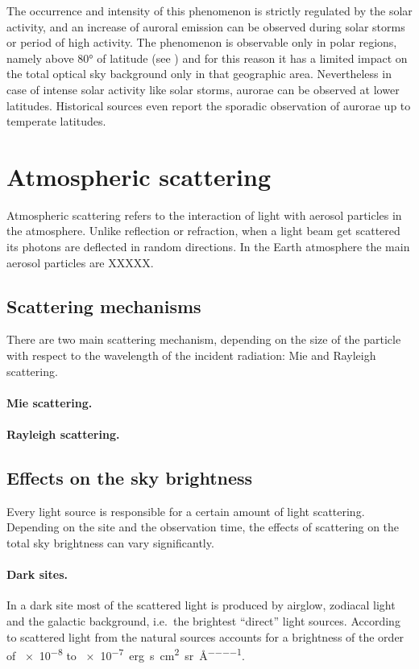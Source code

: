 The occurrence and intensity of this phenomenon is strictly regulated by the solar activity, and an increase of auroral emission can be observed during solar storms or period of high activity. The phenomenon is observable only in polar regions, namely above \ang{80} of latitude (see \cite{eather1969latitudinal}) and for this reason it has a limited impact on the total optical sky background only in that geographic area. Nevertheless in case of intense solar activity like solar storms, aurorae can be observed at lower latitudes. Historical sources even report the sporadic observation of aurorae up to temperate latitudes.


\section{Atmospheric scattering}
Atmospheric scattering refers to the interaction of light with aerosol particles in the atmosphere. Unlike reflection or refraction, when a light beam get scattered its photons are deflected in random directions. In the Earth atmosphere the main aerosol particles are XXXXX.

\subsection{Scattering mechanisms}
There are two main scattering mechanism, depending on the size of the particle with respect to the wavelength of the incident radiation: Mie and Rayleigh scattering.

\paragraph{Mie scattering.}

\paragraph{Rayleigh scattering.}

\subsection{Effects on the sky brightness}
Every light source is responsible for a certain amount of light scattering. Depending on the site and the observation time, the effects of scattering on the total sky brightness can vary significantly.

\paragraph{Dark sites.} In a dark site most of the scattered light is produced by airglow, zodiacal light and the galactic background, i.e.\ the brightest ``direct'' light sources. According to \cite{leinert19981997} scattered light from the natural sources accounts for a brightness of the order of \num{e-8} to \SI{e-7}{erg\per\second \per\centi\metre\squared \per\steradian\per\angstrom}.


